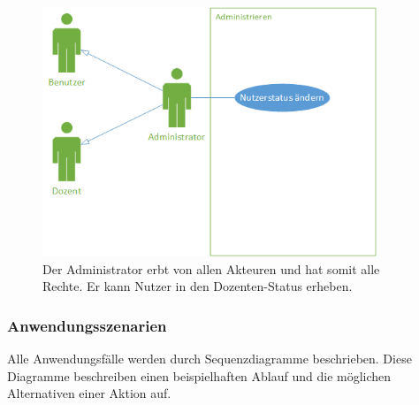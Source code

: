 \documentclass[12pt,a4paper]{article}
\begin{document}
\begin{figure}[H]
	\centering
	\includegraphics[width=10cm]{Bilder/Anwendungsfalldiagramme/Admin.png}
	\caption{Der Administrator erbt von allen Akteuren und hat somit alle Rechte. Er kann Nutzer in den Dozenten-Status erheben.}
	\label{AwfAdmin}
\end{figure}

\newpage

\subsubsection{Anwendungsszenarien}
Alle Anwendungsfälle werden durch Sequenzdiagramme beschrieben. Diese Diagramme beschreiben einen beispielhaften Ablauf und die möglichen Alternativen einer Aktion auf.
\end{document}

